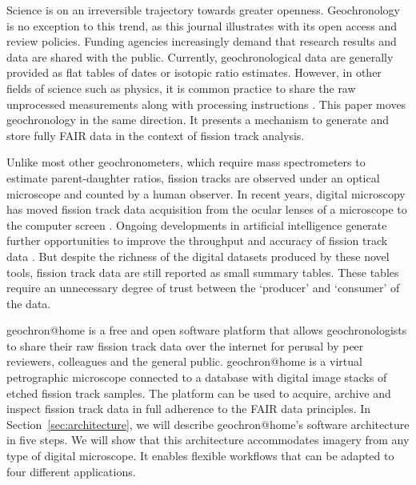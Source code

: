 \documentclass[gchron, manuscript]{copernicus}
\begin{document}
\introduction\label{sec:intro}

Science is on an irreversible trajectory towards greater
openness. Geochronology is no exception to this trend, as this journal
illustrates with its open access and review policies. Funding agencies
increasingly demand that research results and data are shared with the
public. Currently, geochronological data are generally provided as
flat tables of dates or isotopic ratio estimates. However, in other
fields of science such as physics, it is common practice to share the
raw unprocessed measurements along with processing instructions
\citep[e.g.,][]{abbott2016}. This paper moves geochronology in the
same direction. It presents a mechanism to generate and store fully
FAIR \citep[Findable, Accessible, Interoperable and
  Reproducible;][]{wilkinson2016} data in the context of fission track
analysis.\medskip

Unlike most other geochronometers, which require mass spectrometers to
estimate parent-daughter ratios, fission tracks are observed under an
optical microscope and counted by a human observer.  In recent years,
digital microscopy has moved fission track data acquisition from the
ocular lenses of a microscope to the computer screen
\citep{gleadow2009, vanranst2019, gleadow2019}. Ongoing developments
in artificial intelligence generate further opportunities to improve
the throughput and accuracy of fission track data
\citep{nachtergaele2020}. But despite the richness of the digital
datasets produced by these novel tools, fission track data are still
reported as small summary tables. These tables require an unnecessary
degree of trust between the `producer' and `consumer' of the
data.\medskip

geochron@home is a free and open software platform that allows
geochronologists to share their raw fission track data over the
internet for perusal by peer reviewers, colleagues and the general
public. geochron@home is a virtual petrographic microscope connected to a
database with digital image stacks of etched fission track
samples. The platform can be used to acquire, archive and inspect
fission track data in full adherence to the FAIR data principles. In
Section~\ref{sec:architecture}, we will describe geochron@home's software
architecture in five steps. We will show that this architecture
accommodates imagery from any type of digital microscope. It enables
flexible workflows that can be adapted to four different
applications.\medskip
\end{document}
